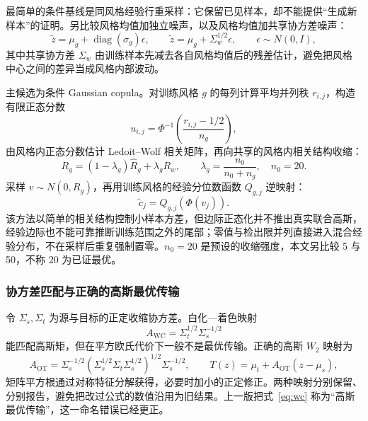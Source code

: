 \documentclass[UTF8,a4paper,zihao=-4]{ctexart}
\numberwithin{figure}{section}
\numberwithin{table}{section}
\numberwithin{equation}{section}
\begin{document}
最简单的条件基线是同风格经验行重采样：它保留已见样本，却不能提供“生成新样本”的证明。另比较风格均值加独立噪声，以及风格均值加共享协方差噪声：
\begin{equation}
\tilde z=\mu_g+\operatorname{diag}(\sigma_g)\epsilon,\qquad
\tilde z=\mu_g+\Sigma_w^{1/2}\epsilon,\qquad \epsilon\sim N(0,I),
\label{eq:noise-baseline}
\end{equation}
其中共享协方差 $\Sigma_w$ 由训练样本先减去各自风格均值后的残差估计，避免把风格中心之间的差异当成风格内部波动。

主候选为条件 Gaussian copula。对训练风格 $g$ 的每列计算平均并列秩 $r_{i,j}$，构造有限正态分数
\begin{equation}
u_{i,j}=\Phi^{-1}\left(\frac{r_{i,j}-1/2}{n_g}\right),
\label{eq:normal-score}
\end{equation}
由风格内正态分数估计 Ledoit--Wolf 相关矩阵，再向共享的风格内相关结构收缩：
\begin{equation}
R_g=(1-\lambda_g)\hat R_g+\lambda_g R_w,\qquad \lambda_g=\frac{n_0}{n_0+n_g},\quad n_0=20.
\label{eq:shrinkage}
\end{equation}
采样 $v\sim N(0,R_g)$，再用训练风格的经验分位数函数 $Q_{g,j}$ 逆映射：
\begin{equation}
\tilde c_j=Q_{g,j}\left(\Phi(v_j)\right).
\label{eq:copula}
\end{equation}
该方法以简单的相关结构控制小样本方差，但边际正态化并不推出真实联合高斯，经验边际也不能可靠推断训练范围之外的尾部；零值与检出限并列直接进入混合经验分布，不在采样后重复强制置零。$n_0=20$ 是预设的收缩强度，本文另比较 5 与 50，不称 20 为已证最优。

\subsubsection{协方差匹配与正确的高斯最优传输}

令 $\Sigma_s,\Sigma_t$ 为源与目标的正定收缩协方差。白化—着色映射
\begin{equation}
A_{\mathrm{WC}}=\Sigma_t^{1/2}\Sigma_s^{-1/2}
\label{eq:wc}
\end{equation}
能匹配高斯矩，但在平方欧氏代价下一般不是最优传输。正确的高斯 $W_2$ 映射\cite{peyre2019}为
\begin{equation}
A_{\mathrm{OT}}=\Sigma_s^{-1/2}\left(\Sigma_s^{1/2}\Sigma_t\Sigma_s^{1/2}\right)^{1/2}\Sigma_s^{-1/2},\qquad
T(z)=\mu_t+A_{\mathrm{OT}}\left(z-\mu_s\right),
\label{eq:ot}
\end{equation}
矩阵平方根通过对称特征分解获得，必要时加小的正定修正。两种映射分别保留、分别报告，避免把改过公式的数值沿用为旧结果。上一版把式~\eqref{eq:wc} 称为“高斯最优传输”，这一命名错误已经更正。
\end{document}
